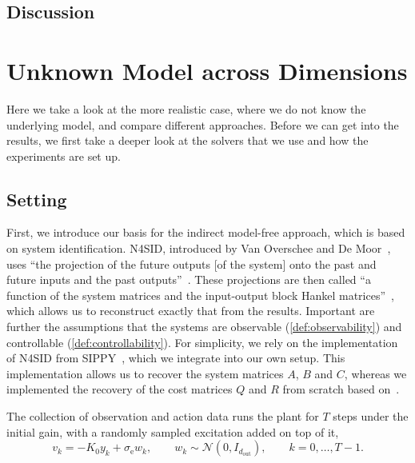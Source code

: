 
\subsection{Discussion}
\label{sec:true-model-discussion}

\section{Unknown Model across Dimensions}
\label{sec:unknown-model}

Here we take a look at the more realistic case, where we do not know the underlying model, and compare different approaches.
Before we can get into the results, we first take a deeper look at the solvers that we use and how the experiments are
set up.

\subsection{Setting}
\label{subsec:unknown-model-setting}

First, we introduce our basis for the indirect model-free approach, which is based on system identification. N4SID,
introduced by Van Overschee and De Moor~\cite{VanOverschee1994N4SID}, uses ``the projection of the future outputs [of the system]
onto the past and future inputs and the past outputs''~\cite[Sec.~3]{VanOverschee1994N4SID}. These projections are then called
``a function of the system matrices and the input-output block Hankel matrices''~\cite[Sec.~3]{VanOverschee1994N4SID}, which
allows us to reconstruct exactly that from the results. Important are further the assumptions that the systems are
observable (\cref{def:observability}) and controllable (\cref{def:controllability}). For simplicity, we rely on the
implementation of N4SID from SIPPY~, which we integrate into our own setup. This implementation allows us
to recover the system matrices $A$, $B$ and $C$, whereas we implemented the recovery of the cost matrices $Q$ and $R$
from scratch based on~\cite{VanOverschee1994N4SID}.

The collection of observation and action data runs the plant for $T$ steps under the initial gain, with a randomly
sampled excitation added on top of it,
\begin{equation}
    \label{eq:identification-input}
    v_k = -K_0 y_k + \sigma_{\mathrm{e}} w_k , \qquad w_k \sim \mathcal{N}(0, I_{d_{\mathrm{out}}}) ,
    \qquad k = 0, \dots, T - 1 .
\end{equation}


